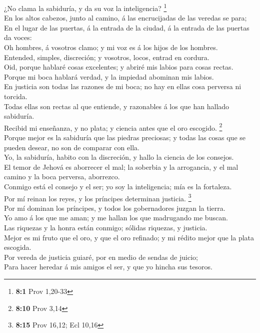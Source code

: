  ¿No clama la sabiduría, y da su voz la inteligencia?
\footnote{\textbf{8:1} Prov 1,20-33}\\
 En los altos cabezos, junto al camino, á las encrucijadas
de las veredas se para;\\
 En el lugar de las puertas, á la entrada de la ciudad, á la
entrada de las puertas da voces:\\
 Oh hombres, á vosotros clamo; y mi voz es á los hijos de
los hombres.\\
 Entended, simples, discreción; y vosotros, locos, entrad en
cordura.\\
 Oid, porque hablaré cosas excelentes; y abriré mis labios
para cosas rectas.\\
 Porque mi boca hablará verdad, y la impiedad abominan mis
labios.\\
 En justicia son todas las razones de mi boca; no hay en
ellas cosa perversa ni torcida.\\
 Todas ellas son rectas al que entiende, y razonables á los
que han hallado sabiduría.\\
 Recibid mi enseñanza, y no plata; y ciencia antes que el
oro escogido. \footnote{\textbf{8:10} Prov 3,14}\\
 Porque mejor es la sabiduría que las piedras preciosas; y
todas las cosas que se pueden desear, no son de comparar con ella.\\
 Yo, la sabiduría, habito con la discreción, y hallo la
ciencia de los consejos.\\
 El temor de Jehová es aborrecer el mal; la soberbia y la
arrogancia, y el mal camino y la boca perversa, aborrezco.\\
 Conmigo está el consejo y el ser; yo soy la inteligencia;
mía es la fortaleza.\\
 Por mí reinan los reyes, y los príncipes determinan
justicia. \footnote{\textbf{8:15} Prov 16,12; Ecl 10,16}\\
 Por mí dominan los príncipes, y todos los gobernadores
juzgan la tierra.\\
 Yo amo á los que me aman; y me hallan los que madrugando
me buscan.\\
 Las riquezas y la honra están conmigo; sólidas riquezas, y
justicia.\\
 Mejor es mi fruto que el oro, y que el oro refinado; y mi
rédito mejor que la plata escogida.\\
 Por vereda de justicia guiaré, por en medio de sendas de
juicio;\\
 Para hacer heredar á mis amigos el ser, y que yo hincha
sus tesoros.

